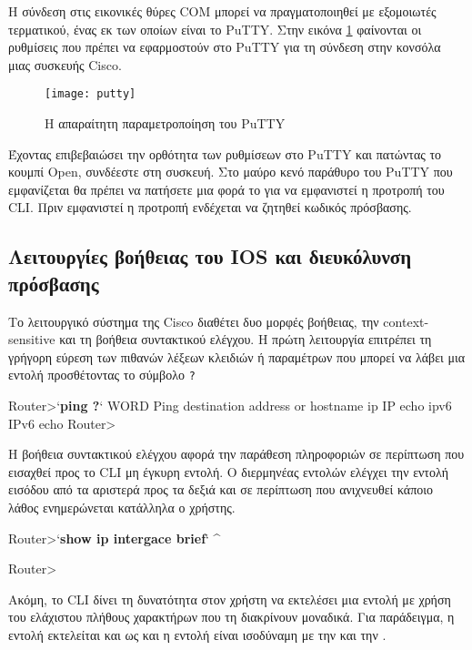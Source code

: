 \documentclass{EdipyLabs} %
\begin{document}
Η σύνδεση στις εικονικές θύρες COM μπορεί να πραγματοποιηθεί με εξομοιωτές τερματικού, ένας εκ των οποίων είναι το PuTTY. Στην εικόνα \ref{fig:putty} φαίνονται οι ρυθμίσεις που πρέπει να εφαρμοστούν στο PuTTY για τη σύνδεση στην κονσόλα μιας συσκευής Cisco.

\begin{figure}[ht]
	\centering
	\texttt{[image: putty]}
	\caption{Η απαραίτητη παραμετροποίηση του PuTTY}\label{fig:putty}
\end{figure}

Έχοντας επιβεβαιώσει την ορθότητα των ρυθμίσεων στο PuTTY και πατώντας το κουμπί Open, συνδέεστε στη συσκευή. Στο μαύρο κενό παράθυρο του PuTTY που εμφανίζεται θα πρέπει να πατήσετε μια φορά το  για να εμφανιστεί η προτροπή του CLI. Πριν εμφανιστεί η προτροπή ενδέχεται να ζητηθεί κωδικός πρόσβασης.

\subsection{Λειτουργίες βοήθειας του IOS και διευκόλυνση πρόσβασης}
Το λειτουργικό σύστημα της Cisco διαθέτει δυο μορφές βοήθειας, την context-sensitive και τη βοήθεια συντακτικού ελέγχου. Η πρώτη λειτουργία επιτρέπει τη γρήγορη εύρεση των πιθανών λέξεων κλειδιών ή παραμέτρων που μπορεί να λάβει μια εντολή προσθέτοντας το σύμβολο \texttt{?}

\begin{CommandBox}
Router>`\textbf{ping ?}`
  WORD  Ping destination address or hostname
  ip    IP echo
  ipv6  IPv6 echo
Router>
\end{CommandBox}

Η βοήθεια συντακτικού ελέγχου αφορά την παράθεση πληροφοριών σε περίπτωση που εισαχθεί προς το CLI μη έγκυρη εντολή. Ο διερμηνέας εντολών ελέγχει την εντολή εισόδου από τα αριστερά προς τα δεξιά και σε περίπτωση που ανιχνευθεί κάποιο λάθος ενημερώνεται κατάλληλα ο χρήστης.

\begin{CommandBox}
Router>`\textbf{show ip intergace brief}`
                    ^

Router>
\end{CommandBox}

Ακόμη, το CLI δίνει τη δυνατότητα στον χρήστη να εκτελέσει μια εντολή με χρήση του ελάχιστου πλήθους χαρακτήρων που τη διακρίνουν μοναδικά. Για παράδειγμα, η εντολή  εκτελείται και ως  και η εντολή  είναι ισοδύναμη με την  και την . 
\end{document}
